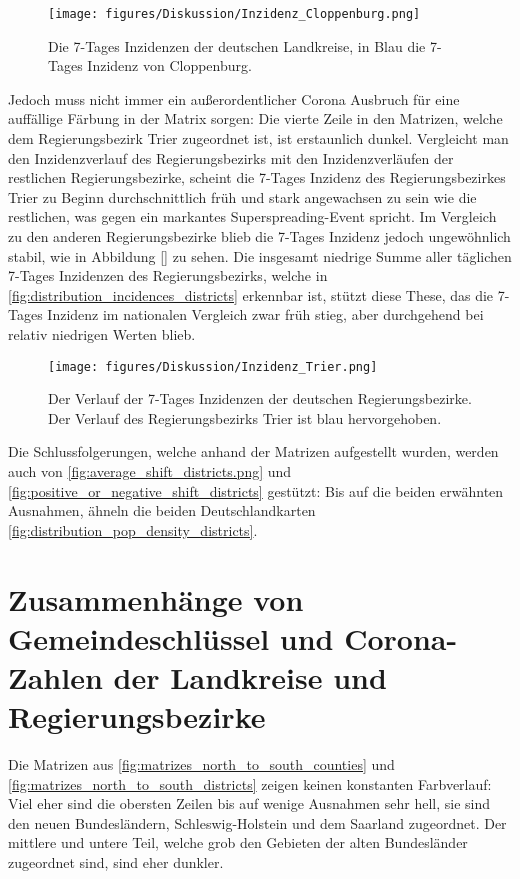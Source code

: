 \begin{figure}
    \centering
    \texttt{[image: figures/Diskussion/Inzidenz\_Cloppenburg.png]}
    \caption{Die 7-Tages Inzidenzen der deutschen Landkreise, in Blau die 7-Tages Inzidenz von Cloppenburg.}
    \label{fig:cloppenburg}
\end{figure}

Jedoch muss nicht immer ein außerordentlicher Corona Ausbruch für eine auffällige Färbung in der Matrix sorgen: Die vierte Zeile in den Matrizen, welche dem Regierungsbezirk Trier zugeordnet ist, ist erstaunlich dunkel.
Vergleicht man den Inzidenzverlauf des Regierungsbezirks mit den Inzidenzverläufen der restlichen Regierungsbezirke, scheint die 7-Tages Inzidenz des Regierungsbezirkes Trier zu Beginn durchschnittlich früh und stark angewachsen zu sein wie die restlichen, was gegen ein markantes Superspreading-Event spricht. Im Vergleich zu den anderen Regierungsbezirke blieb die 7-Tages Inzidenz jedoch ungewöhnlich stabil, wie in Abbildung \autoref{} zu sehen. Die insgesamt niedrige Summe aller täglichen 7-Tages Inzidenzen des Regierungsbezirks, welche in \autoref{fig:distribution_incidences_districts} erkennbar ist, stützt diese These, das die 7-Tages Inzidenz im nationalen Vergleich zwar früh stieg, aber durchgehend bei relativ niedrigen Werten blieb.

\begin{figure}
    \centering
    \texttt{[image: figures/Diskussion/Inzidenz\_Trier.png]}
    \caption{Der Verlauf der 7-Tages Inzidenzen der deutschen Regierungsbezirke. Der Verlauf des Regierungsbezirks Trier ist blau hervorgehoben.}
    \label{fig:my_label}
\end{figure}



Die Schlussfolgerungen, welche anhand der Matrizen aufgestellt wurden, werden auch von \autoref{fig:average_shift_districts.png} und \autoref{fig:positive_or_negative_shift_districts} gestützt: Bis auf die beiden erwähnten Ausnahmen, ähneln die beiden Deutschlandkarten \autoref{fig:distribution_pop_density_districts}.

\section{Zusammenhänge von Gemeindeschlüssel und Corona-Zahlen der Landkreise und Regierungsbezirke}
Die Matrizen aus \autoref{fig:matrizes_north_to_south_counties} und \autoref{fig:matrizes_north_to_south_districts} zeigen keinen konstanten Farbverlauf: Viel eher sind die obersten Zeilen bis auf wenige Ausnahmen sehr hell, sie sind den neuen Bundesländern, Schleswig-Holstein und dem Saarland zugeordnet. Der mittlere und untere Teil, welche grob den Gebieten der alten Bundesländer zugeordnet sind, sind eher dunkler.

